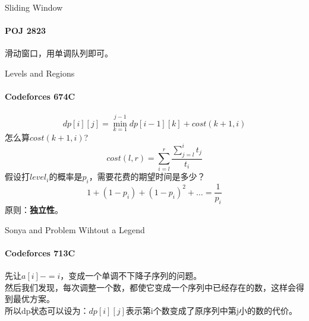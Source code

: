 \documentclass[hyperref={unicode=true}]{beamer}
\theoremstyle{definition}
\theoremstyle{proof}
\begin{document}
\begin{frame}{Sliding Window}
  \framesubtitle{POJ 2823}
  滑动窗口，用单调队列即可。
\end{frame}

\begin{frame}{Levels and Regions}
  \framesubtitle{Codeforces 674C}
  \[dp[i][j] = \min_{k=1}^{j-1}{dp[i-1][k] + cost(k+1, i)}\]
  怎么算$cost(k+1, i)$?
  \[cost(l,r)=\sum_{i=l}^{r}\frac{\sum_{j=l}^{i}{t_j}}{t_i}\]
  假设打$level_i$的概率是$p_i$，需要花费的期望时间是多少？
  \[1 + (1-p_i) + {(1-p_i)}^2 + \ldots = \frac{1}{p_i}\]
  原则：{\bf 独立性}。
\end{frame}

\begin{frame}{Sonya and Problem Wihtout a Legend}
  \framesubtitle{Codeforces 713C}
  先让$a[i]-=i$，变成一个单调不下降子序列的问题。\\
  然后我们发现，每次调整一个数，都使它变成一个序列中已经存在的数，这样会得到最优方案。\\
  所以dp状态可以设为：$dp[i][j]$表示第i个数变成了原序列中第j小的数的代价。
\end{frame}
\end{document}
